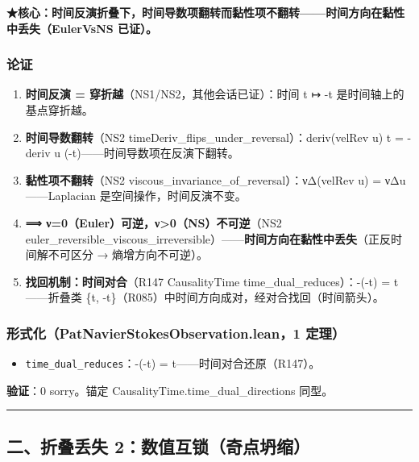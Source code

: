 \documentclass[
]{article}
\providecommand{\tightlist}{%
 \setlength{\itemsep}{0pt}\setlength{\parskip}{0pt}}
\begin{document}
\textbf{★核心：时间反演折叠下，时间导数项翻转而黏性项不翻转------时间方向在黏性中丢失（EulerVsNS
已证）。}

\subsubsection{论证}\label{ux8bbaux8bc1}

\begin{enumerate}
\def\labelenumi{\arabic{enumi}.}
\tightlist
\item
 \textbf{时间反演 = 穿折越}（NS1/NS2，其他会话已证）：时间 t ↦ -t
 是时间轴上的基点穿折越。
\item
 \textbf{时间导数翻转}（NS2
 timeDeriv\_flips\_under\_reversal）：deriv(velRev u) t = -deriv u
 (-t)------时间导数项在反演下翻转。
\item
 \textbf{黏性项不翻转}（NS2
 viscous\_invariance\_of\_reversal）：νΔ(velRev u) = νΔu------Laplacian
 是空间操作，时间反演不变。
\item
 \textbf{⟹ ν=0（Euler）可逆，ν\textgreater0（NS）不可逆}（NS2
 euler\_reversible\_viscous\_irreversible）------\textbf{时间方向在黏性中丢失}（正反时间解不可区分
 → 熵增方向不可逆）。
\item
 \textbf{找回机制：时间对合}（R147 CausalityTime
 time\_dual\_reduces）：-(-t) = t------折叠类 \{t,
 -t\}（R085）中时间方向成对，经对合找回（时间箭头）。
\end{enumerate}

\subsubsection{形式化（PatNavierStokesObservation.lean，1
定理）}\label{ux5f62ux5f0fux5316patnavierstokesobservation.lean1-ux5b9aux7406}

\begin{itemize}
\tightlist
\item
 \texttt{time\_dual\_reduces}：-(-t) = t------时间对合还原（R147）。
\end{itemize}

\textbf{验证}：0 sorry。锚定 CausalityTime.time\_dual\_directions 同型。

\begin{center}\rule{0.5\linewidth}{0.5pt}\end{center}

\subsection{二、折叠丢失
2：数值互锁（奇点坍缩）}\label{ux4e8cux6298ux53e0ux4e22ux5931-2ux6570ux503cux4e92ux9501ux5947ux70b9ux574dux7f29}
\end{document}
